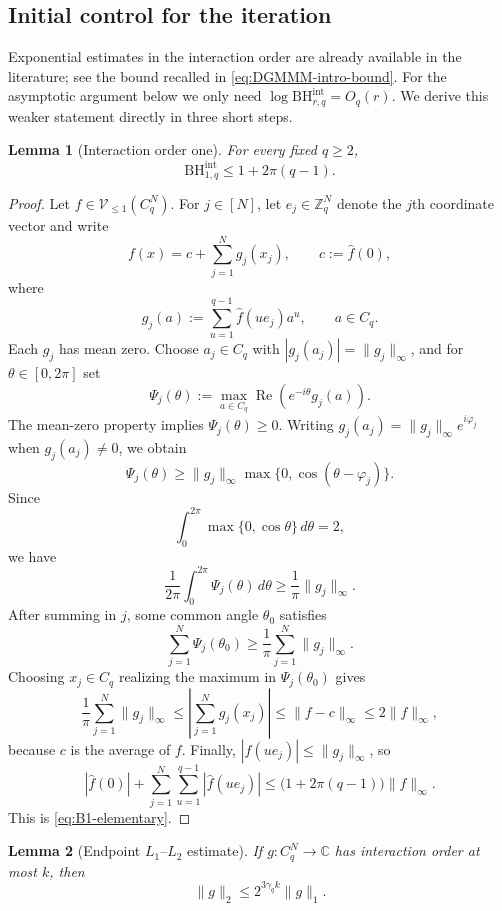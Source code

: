 \documentclass[11pt,a4paper]{article}
\numberwithin{equation}{section}
\theoremstyle{cleanplain}
\newtheorem{lemma}[lemma]{Lemma}
\theoremstyle{cleandefinition}
\theoremstyle{cleanremark}
\newcommand{\C}{\mathbb C}
\newcommand{\BHint}[2]{\mathrm{BH}^{\mathrm{int}}_{#1,#2}}
\begin{document}
\subsection{Initial control for the iteration}\label{subsec:coarse-start}

Exponential estimates in the interaction order are already available in the
literature; see the bound recalled in \eqref{eq:DGMMM-intro-bound}.  For the
asymptotic argument below we only need
$\log\BHint{r}{q}=O_q(r)$.  We derive this weaker statement directly in three
short steps.

\begin{lemma}[Interaction order one]\label{lem:interaction-one}
For every fixed $q\geq2$,
\begin{equation}\label{eq:B1-elementary}
 \BHint{1}{q}\leq 1+2\pi(q-1).
\end{equation}
\end{lemma}

\begin{proof}
Let $f\in\mathcal V_{\leq1}(C_q^N)$.  For $j\in[N]$, let
$e_j\in\mathbb Z_q^N$ denote the $j$th coordinate vector and write
\[
 f(x)=c+\sum_{j=1}^Ng_j(x_j),
 \qquad c:=\widehat f(0),
\]
where
\[
 g_j(a):=\sum_{u=1}^{q-1}\widehat f(u e_j)a^u,
 \qquad a\in C_q.
\]
Each $g_j$ has mean zero.  Choose $a_j\in C_q$ with
$|g_j(a_j)|=\|g_j\|_\infty$, and for $\theta\in[0,2\pi]$ set
\[
 \Psi_j(\theta):=
 \max_{a\in C_q}\operatorname{Re}(e^{-i\theta}g_j(a)).
\]
The mean-zero property implies $\Psi_j(\theta)\geq0$.  Writing
$g_j(a_j)=\|g_j\|_\infty e^{i\varphi_j}$ when $g_j(a_j)\neq0$, we obtain
\[
 \Psi_j(\theta)\geq
 \|g_j\|_\infty\max\{0,\cos(\theta-\varphi_j)\}.
\]
Since
\[
 \int_0^{2\pi}\max\{0,\cos\theta\}\,d\theta=2,
\]
we have
\[
 \frac1{2\pi}\int_0^{2\pi}\Psi_j(\theta)\,d\theta
 \geq\frac1\pi\|g_j\|_\infty.
\]
After summing in $j$, some common angle $\theta_0$ satisfies
\[
 \sum_{j=1}^N\Psi_j(\theta_0)
 \geq\frac1\pi\sum_{j=1}^N\|g_j\|_\infty.
\]
Choosing $x_j\in C_q$ realizing the maximum in
$\Psi_j(\theta_0)$ gives
\[
 \frac1\pi\sum_{j=1}^N\|g_j\|_\infty
 \leq
 \left|\sum_{j=1}^Ng_j(x_j)\right|
 \leq\|f-c\|_\infty
 \leq2\|f\|_\infty,
\]
because $c$ is the average of $f$.  Finally,
$|\widehat f(u e_j)|\leq\|g_j\|_\infty$, so
\[
 |\widehat f(0)|+
 \sum_{j=1}^N\sum_{u=1}^{q-1}|\widehat f(u e_j)|
 \leq
 \bigl(1+2\pi(q-1)\bigr)\|f\|_\infty.
\]
This is \eqref{eq:B1-elementary}.
\end{proof}

\begin{lemma}[Endpoint $L_1$--$L_2$ estimate]\label{lem:endpoint-L1-L2}
If $g:C_q^N\to\C$ has interaction order at most $k$, then
\begin{equation}\label{eq:L1-L2-coarse}
 \|g\|_2\leq2^{3\gamma_q k}\|g\|_1.
\end{equation}
\end{lemma}
\end{document}
